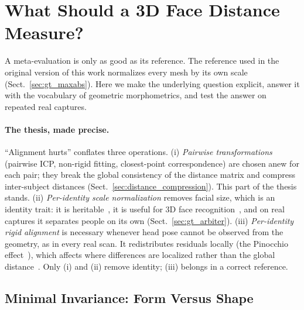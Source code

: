 
\section{What Should a 3D Face Distance Measure?}
\label{sec:gt}

A meta-evaluation is only as good as its reference. The reference used in the
original version of this work normalizes every mesh by its own scale
(Sect.~\ref{sec:gt_maxabs}). Here we make the underlying question explicit,
answer it with the vocabulary of geometric morphometrics, and test the answer
on repeated real captures.

\paragraph{The thesis, made precise.}
``Alignment hurts'' conflates three operations.
(i) \emph{Pairwise transformations} (pairwise ICP, non-rigid fitting,
closest-point correspondence) are chosen anew for each pair; they break the
global consistency of the distance matrix and compress inter-subject
distances (Sect.~\ref{sec:distance_compression}). This part of the thesis
stands.
(ii) \emph{Per-identity scale normalization} removes facial size, which is an
identity trait: it is heritable~\cite{cole2016heritability}, it is useful
for 3D face recognition~\cite{russ2006normalization}, and on real captures it
separates people on its own (Sect.~\ref{sec:gt_arbiter}).
(iii) \emph{Per-identity rigid alignment} is necessary whenever head pose
cannot be observed from the geometry, as in every real scan. It redistributes
residuals locally (the Pinocchio effect~\cite{walker2000pinocchio,vonCramon2007pinocchio}),
which affects where differences are localized rather than the global
distance~\cite{klingenberg2020pinocchio}.
Only (i) and (ii) remove identity; (iii) belongs in a correct reference.

\subsection{Minimal Invariance: Form Versus Shape}
\label{sec:gt_principle}

